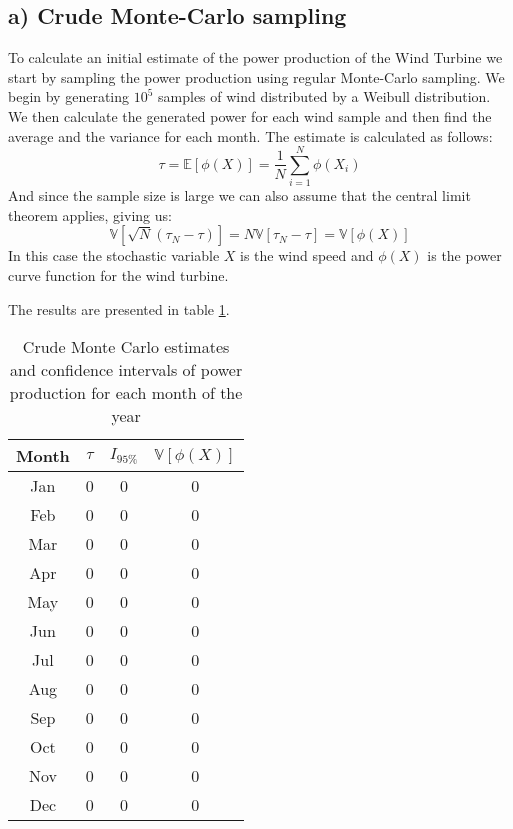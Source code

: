 \documentclass[a4paper]{article}
\begin{document}
\subsection*{a) Crude Monte-Carlo sampling}
To calculate an initial estimate of the power production of the Wind Turbine we start by sampling the power production using regular Monte-Carlo sampling. We begin by generating $10^5$ samples of wind distributed by a Weibull distribution. We then calculate the generated power for each wind sample and then find the average and the variance for each month. The estimate is calculated as follows:
\begin{equation}
    \tau = \mathbb{E}[\phi(X)] = \frac{1}{N}\sum_{i = 1}^N\phi(X_i)
\end{equation}
And since the sample size is large we can also assume that the central limit theorem applies, giving us:
\begin{equation}
    \mathbb{V}[\sqrt{N}(\tau_N-\tau)] = N\mathbb{V}[\tau_N-\tau] = \mathbb{V}[\phi(X)]
\end{equation}
In this case the stochastic variable $X$ is the wind speed and $\phi(X)$ is the power curve function for the wind turbine.

The results are presented in table \ref{CrudeResults}.
\begin{table}
    \centering
    \caption{Crude Monte Carlo estimates and confidence intervals of power production for each month of the year}
    \label{CrudeResults}
    \begin{tabular}{|c|| c c c ||}
        \hline
        Month & $\tau$ & $I_{95\%}$ & $\mathbb{V}[\phi(X)]$ \\
        \hline\hline
        Jan & 0 & 0 & 0 \\
        \hline
        Feb & 0 & 0 & 0 \\
        \hline
        Mar & 0 & 0 & 0 \\
        \hline
        Apr & 0 & 0 & 0 \\
        \hline
        May & 0 & 0 & 0 \\
        \hline
        Jun & 0 & 0 & 0 \\
        \hline
        Jul & 0 & 0 & 0 \\
        \hline
        Aug & 0 & 0 & 0 \\
        \hline
        Sep & 0 & 0 & 0 \\
        \hline
        Oct & 0 & 0 & 0 \\
        \hline
        Nov & 0 & 0 & 0 \\
        \hline
        Dec & 0 & 0 & 0 \\
        \hline

    \end{tabular}
\end{table}
\end{document}

